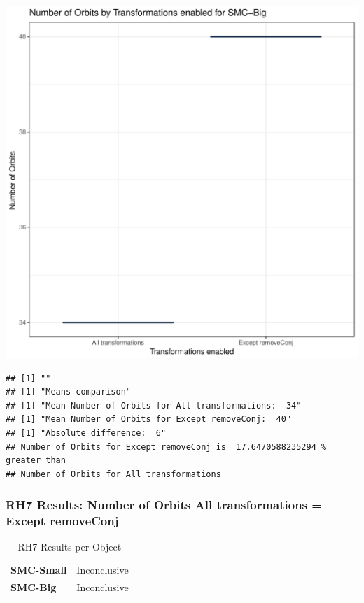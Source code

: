 \documentclass{article}\usepackage[]{graphicx}\usepackage[]{color}
\makeatletter
\def\maxwidth{ %
  \ifdim\Gin@nat@width>\linewidth
    \linewidth
  \else
    \Gin@nat@width
  \fi
}
\newenvironment{kframe}{%
 \def\at@end@of@kframe{}%
 \ifinner\ifhmode%
  \def\at@end@of@kframe{\end{minipage}}%
  \begin{minipage}{\columnwidth}%
 \fi\fi%
 \def\FrameCommand##1{\hskip\@totalleftmargin \hskip-\fboxsep
 \colorbox{shadecolor}{##1}\hskip-\fboxsep
     \hskip-\linewidth \hskip-\@totalleftmargin \hskip\columnwidth}%
 \MakeFramed {\advance\hsize-\width
   \@totalleftmargin\z@ \linewidth\hsize
   \@setminipage}}%
 {\par\unskip\endMakeFramed%
 \at@end@of@kframe}
\newenvironment{knitrout}{}{} %
\makeatother
\begin{document}
\begin{knitrout}
\color{fgcolor}
\includegraphics[width=\maxwidth]{figure/RH7_big-1} 
\begin{kframe}

{\ttfamily\noindent\bfseries\color{errorcolor}{\#\# Error in eval(expr, envir, enclos): object 'shap\_cashew\_big' not found}}\begin{verbatim}
## [1] ""
## [1] "Means comparison"
## [1] "Mean Number of Orbits for All transformations:  34"
## [1] "Mean Number of Orbits for Except removeConj:  40"
## [1] "Absolute difference:  6"
## Number of Orbits for Except removeConj is  17.6470588235294 % greater than 
## Number of Orbits for All transformations
\end{verbatim}
\end{kframe}
\end{knitrout}


 

	
	\subsubsection{RH7 Results: Number of Orbits All transformations = Except removeConj}
	
	
	\begin{table}[H]
	\centering
	\caption{RH7 Results per Object}
	\begin{tabular}{ll}
	\textbf{SMC-Small} & Inconclusive \\
	\textbf{SMC-Big} & Inconclusive \\
	\end{tabular}
	\end{table}
\end{document}

